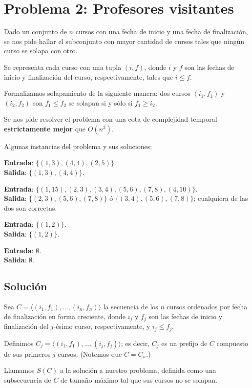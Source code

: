 \documentclass[a4paper,10pt,twoside]{article}
\begin{document}
\section{Problema 2: Profesores visitantes}

Dado un conjunto de $n$ cursos con una fecha de inicio y una fecha de finalización, se nos pide hallar el subconjunto con mayor cantidad de cursos tales que ningún curso se solapa con otro.

Se representa cada curso con una tupla $(i, f)$, donde $i$ y $f$ son las fechas de inicio y finalización del curso, respectivamente, tales que $i \leq f$.

Formalizamos solapamiento de la siguiente manera: dos cursos $(i_1, f_1)$ y $(i_2, f_2)$ con $f_1 \leq f_2$ se solapan si y sólo si $f_1 \geq i_2$.

Se nos pide resolver el problema con una cota de complejidad temporal \textbf{estrictamente mejor} que $O(n^2)$.

Algunas instancias del problema y sus soluciones:

\textbf{Entrada}: $\{(1, 3), (4, 4), (2, 5)\}$.\\
\textbf{Salida}: $\{(1, 3), (4, 4)\}$.

\textbf{Entrada}: $\{(1, 15), (2, 3), (3, 4), (5, 6), (7, 8), (4, 10)\}$.\\
\textbf{Salida}: $\{(2, 3), (5, 6), (7, 8)\}$ ó $\{(3, 4), (5, 6), (7, 8)\}$; cualquiera de las dos son correctas.

\textbf{Entrada}: $\{(1, 2)\}$.\\
\textbf{Salida}: $\{(1, 2)\}$.

\textbf{Entrada}: $\emptyset$.\\
\textbf{Salida}: $\emptyset$.


\subsection{Solución}

Sea $C = \langle (i_1, f_1), \ldots, (i_n, f_n) \rangle$ la secuencia de los $n$ cursos ordenados por fecha de finalización en forma creciente, donde $i_j$ y $f_j$ son las fechas de inicio y finalización del $j$-ésimo curso, respectivamente, y $i_j \leq f_j$.

Definimos $C_j = \langle (i_1, f_1), \ldots, (i_j, f_j) \rangle$; es decir, $C_j$ es un prefijo de $C$ compuesto de sus primeros $j$ cursos. (Notemos que $C = C_n$.)

Llamamos $S(C)$ a la solución a nuestro problema, definida como una subsecuencia de $C$ de tamaño máximo tal que sus cursos no se solapan.
\end{document}
